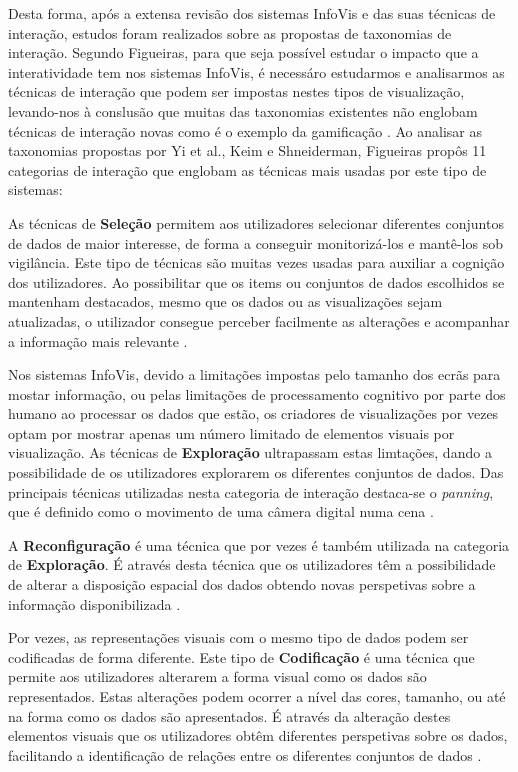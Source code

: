 Desta forma, após a extensa revisão dos sistemas \gls{InfoVis} e das suas técnicas de interação, estudos foram realizados sobre as propostas de taxonomias de interação. Segundo Figueiras, para que seja possível estudar o impacto que a interatividade tem nos sistemas \gls{InfoVis}, é necessáro estudarmos e analisarmos as técnicas de interação que podem ser impostas nestes tipos de visualização, levando-nos à conslusão que muitas das taxonomias existentes não englobam técnicas de interação novas como é o exemplo da gamificação \cite{figueiras2015towards}. Ao analisar as taxonomias propostas por Yi et al., Keim  e Shneiderman, Figueiras propôs 11 categorias de interação que englobam as técnicas mais usadas por este tipo de sistemas:

As técnicas de \textbf{Seleção} permitem aos utilizadores selecionar diferentes conjuntos de dados de maior interesse, de forma a conseguir monitorizá-los e mantê-los sob vigilância. Este tipo de técnicas são muitas vezes usadas para auxiliar a cognição dos utilizadores. Ao possibilitar que os items ou conjuntos de dados escolhidos se mantenham destacados, mesmo que os dados ou as visualizações sejam atualizadas, o utilizador consegue perceber facilmente as alterações e acompanhar a informação mais relevante \cite{yi2007toward, figueiras2015towards}.

Nos sistemas \gls{InfoVis}, devido a limitações impostas pelo tamanho dos ecrãs para mostar informação, ou pelas limitações de processamento cognitivo por parte dos humano ao processar os dados que estão, os criadores de visualizações por vezes optam por mostrar apenas um número limitado de elementos visuais por visualização. As técnicas de \textbf{Exploração} ultrapassam estas limtações, dando a possibilidade de os utilizadores explorarem os diferentes conjuntos de dados. Das principais técnicas utilizadas nesta categoria de interação destaca-se o \textit{panning}, que é definido como o movimento de uma câmera digital numa cena \cite{yi2007toward, figueiras2015towards}.

A \textbf{Reconfiguração} é uma técnica que por vezes é também utilizada na categoria de \textbf{Exploração}. É através desta técnica que os utilizadores têm a possibilidade de alterar a disposição espacial dos dados obtendo novas perspetivas sobre a informação disponibilizada \cite{yi2007toward, figueiras2015towards}.

Por vezes, as representações visuais com o mesmo tipo de dados podem ser codificadas de forma diferente. Este tipo de \textbf{Codificação} é uma técnica que permite aos utilizadores alterarem a forma visual como os dados são representados. Estas alterações podem ocorrer a nível das cores, tamanho, ou até na forma como os dados são apresentados. É através da alteração destes elementos visuais que os utilizadores obtêm diferentes perspetivas sobre os dados, facilitando a identificação de relações entre os diferentes conjuntos de dados \cite{yi2007toward}.

